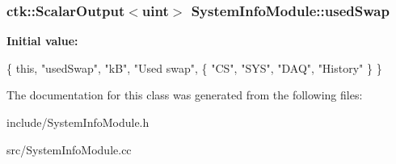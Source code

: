 \subsubsection[{\texorpdfstring{used\+Swap}{usedSwap}}]{\setlength{\rightskip}{0pt plus 5cm}ctk\+::\+Scalar\+Output$<$uint$>$ System\+Info\+Module\+::used\+Swap}\hypertarget{classSystemInfoModule_a9f4b7080f1b4c5c5c8779cbeb10cae6a}{}\label{classSystemInfoModule_a9f4b7080f1b4c5c5c8779cbeb10cae6a}
{\bfseries Initial value\+:}
\begin{DoxyCode}
\{ \textcolor{keyword}{this}, \textcolor{stringliteral}{"usedSwap"}, \textcolor{stringliteral}{"kB"}, \textcolor{stringliteral}{"Used swap"},
    \{ \textcolor{stringliteral}{"CS"}, \textcolor{stringliteral}{"SYS"}, \textcolor{stringliteral}{"DAQ"}, \textcolor{stringliteral}{"History"} \} \}
\end{DoxyCode}


The documentation for this class was generated from the following files\+:\begin{DoxyCompactItemize}
\item 
include/System\+Info\+Module.\+h\item 
src/System\+Info\+Module.\+cc\end{DoxyCompactItemize}
